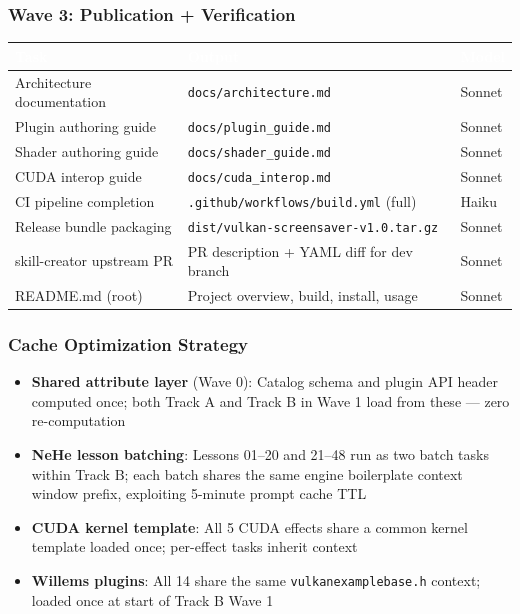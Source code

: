 \documentclass[11pt,letterpaper]{article}
\newcommand{\tableheader}[1]{\textbf{\sffamily\textcolor{white}{#1}}}
\begin{document}
\subsubsection{Wave 3: Publication + Verification}

\begin{center}
\begin{tabularx}{\textwidth}{L{3.5cm}XC{1.5cm}}
\toprule
{}
\tableheader{Task} & \tableheader{Output} & \tableheader{Model} \\
\midrule
Architecture documentation & \texttt{docs/architecture.md} & Sonnet \\
Plugin authoring guide & \texttt{docs/plugin\_guide.md} & Sonnet \\
Shader authoring guide & \texttt{docs/shader\_guide.md} & Sonnet \\
CUDA interop guide & \texttt{docs/cuda\_interop.md} & Sonnet \\
CI pipeline completion & \texttt{.github/workflows/build.yml} (full) & Haiku \\
Release bundle packaging & \texttt{dist/vulkan-screensaver-v1.0.tar.gz} & Sonnet \\
skill-creator upstream PR & PR description + YAML diff for dev branch & Sonnet \\
README.md (root) & Project overview, build, install, usage & Sonnet \\
\bottomrule
\end{tabularx}
\end{center}

\subsubsection{Cache Optimization Strategy}

\begin{itemize}
\item \textbf{Shared attribute layer} (Wave 0): Catalog schema and plugin API header computed once; both Track A and Track B in Wave 1 load from these — zero re-computation
\item \textbf{NeHe lesson batching}: Lessons 01--20 and 21--48 run as two batch tasks within Track B; each batch shares the same engine boilerplate context window prefix, exploiting 5-minute prompt cache TTL
\item \textbf{CUDA kernel template}: All 5 CUDA effects share a common kernel template loaded once; per-effect tasks inherit context
\item \textbf{Willems plugins}: All 14 share the same \texttt{vulkanexamplebase.h} context; loaded once at start of Track B Wave 1
\end{itemize}
\end{document}
